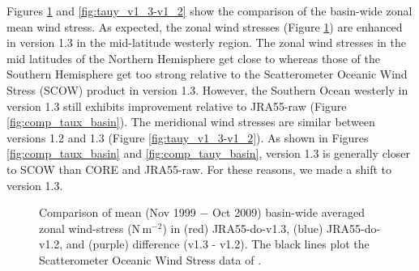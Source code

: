 \documentclass[dvipdfmx]{elsarticle_mod}
\begin{document}
Figures \ref{fig:taux_v1_3-v1_2} and \ref{fig:tauy_v1_3-v1_2} show the comparison of the basin-wide zonal mean wind stress. As expected, the zonal wind stresses (Figure \ref{fig:taux_v1_3-v1_2}) are enhanced in version 1.3 in the mid-latitude westerly region. The zonal wind stresses in the mid latitudes of the Northern Hemisphere get close to whereas those of the Southern Hemisphere get too strong relative to the Scatterometer Oceanic Wind Stress (SCOW) product \citep{Risien_and_Chelton_2008} in version 1.3. However, the Southern Ocean westerly in version 1.3 still exhibits improvement relative to JRA55-raw (Figure \ref{fig:comp_taux_basin}). The meridional wind stresses are similar between versions 1.2 and 1.3 (Figure \ref{fig:tauy_v1_3-v1_2}). As shown in Figures \ref{fig:comp_taux_basin} and \ref{fig:comp_tauy_basin}, version 1.3 is generally closer to SCOW than CORE and JRA55-raw. For these reasons, we made a shift to version 1.3.


\begin{figure}[h]
  \centering
  \caption{Comparison of mean (Nov 1999 $-$ Oct 2009) basin-wide averaged zonal wind-stress ($\mathrm{N}\,\mathrm{m}^{-2}$) in (red) JRA55-do-v1.3, (blue) JRA55-do-v1.2, and (purple) difference (v1.3 - v1.2). The black lines plot the Scatterometer Oceanic Wind Stress data of \citet{Risien_and_Chelton_2008}.}
  \label{fig:taux_v1_3-v1_2}
\end{figure}
\end{document}
